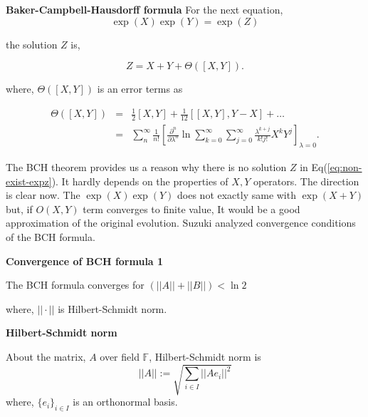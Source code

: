 \begin{theorem} \textbf{Baker-Campbell-Hausdorff formula}
    \label{theorem:BCH}
    For the next equation, 
    \begin{equation*}\exp(X) \exp(Y) = \exp(Z)\end{equation*}

    the solution $Z$ is,

    \begin{equation}
        Z = X + Y + \Theta([X, Y]) .
    \end{equation}

    where, $\Theta([X, Y])$ is an error terms as
    
    \begin{eqnarray}
        \Theta([X, Y]) &=& \frac{1}{2}[X, Y] + \frac{1}{12} [[X, Y], Y-X] + \dots \\
        &=& \sum_n^\infty \frac{1}{n!} \left[\frac{\partial^n}{\partial \lambda^n} \ln \sum_{k=0}^\infty \sum_{j=0}^\infty  \frac{\lambda^{k+j}}{k! j!} X^k Y^j \right]_{\lambda = 0} .
    \end{eqnarray}
\end{theorem}

The BCH theorem provides us a reason why there is no solution $Z$ in Eq(\ref{eq:non-exist-expz}).
It hardly depends on the properties of $X, Y$ operators.
The direction is clear now. 
The $\exp(X)\exp(Y)$ does not exactly same with $\exp(X+Y)$ but, if $O(X, Y)$ term converges to finite value,
It would be a good approximation of the original evolution.
Suzuki analyzed convergence conditions of the BCH formula\cite{suzuki_convergence_1977}.

\begin{theorem} \textbf{Convergence of BCH formula 1}

    The BCH formula converges for $(||A|| + ||B||) < \ln2$    
\end{theorem}
where, $||\cdot||$ is Hilbert-Schmidt norm.

\begin{definition} \textbf{Hilbert-Schmidt norm} %

    About the matrix, $A$ over field $\mathbb{F}$, Hilbert-Schmidt norm is 
    \begin{equation*}
        ||A|| := \sqrt{\sum_{i \in I} ||Ae_i||^2}
    \end{equation*} 
    where, $\{e_i\}_{i \in I}$ is an orthonormal basis.
\end{definition}

